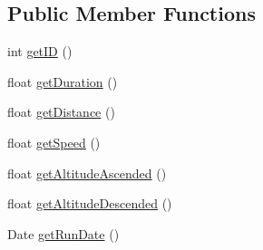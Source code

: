 \subsection*{Public Member Functions}
\begin{DoxyCompactItemize}
\item 
int \mbox{\hyperlink{classcom_1_1activitytracker_1_1_run_a61916c14ab5a2bf6b080200f7d0c5566}{get\+ID}} ()
\item 
float \mbox{\hyperlink{classcom_1_1activitytracker_1_1_run_af0d3f62a282a94fe74a1bdfa0c3dc277}{get\+Duration}} ()
\item 
float \mbox{\hyperlink{classcom_1_1activitytracker_1_1_run_a2d3b805547023d02f99634e09c6fa086}{get\+Distance}} ()
\item 
float \mbox{\hyperlink{classcom_1_1activitytracker_1_1_run_a913fd24db87de94db1c6decaad51e5f1}{get\+Speed}} ()
\item 
float \mbox{\hyperlink{classcom_1_1activitytracker_1_1_run_a9365647310eee181b15a85eaf6b95e93}{get\+Altitude\+Ascended}} ()
\item 
float \mbox{\hyperlink{classcom_1_1activitytracker_1_1_run_a75d18e68f984a4f5481e25f2c70f0492}{get\+Altitude\+Descended}} ()
\item 
Date \mbox{\hyperlink{classcom_1_1activitytracker_1_1_run_a3673ace303ad8026cdc80a6d6e7e3533}{get\+Run\+Date}} ()
\end{DoxyCompactItemize}
